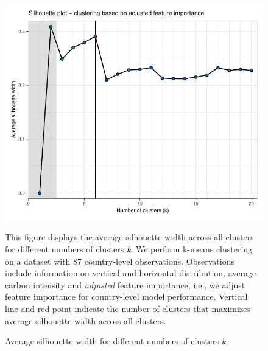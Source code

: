 \documentclass[12pt, a4paper]{article}
\newenvironment{subcaption}
{\strut
\vspace{-5pt}
\begin{minipage}[b]{0.9\textwidth}
  \hspace*{-\parindent}
  \footnotesize}
 {\end{minipage}}
\begin{document}





  \begin{figure}[ht!]
   \centering
   \caption{Average silhouette width for different numbers of clusters \textit{k}} \label{fig:G3_silhouette_2}
   \includegraphics{Figures_Appendix/Figure_Silhouette_2}
   \begin{subcaption}
     This figure displays the average silhouette width across all clusters for different numbers of clusters \textit{k}. We perform k-means clustering on a dataset with 87 country-level observations. Observations include information on vertical and horizontal distribution, average carbon intensity and \textit{adjusted} feature importance, i.e., we adjust feature importance for country-level model performance. Vertical line and red point indicate the number of clusters that maximizes average silhouette width across all clusters.
   \end{subcaption}
 \end{figure}
\end{document}
